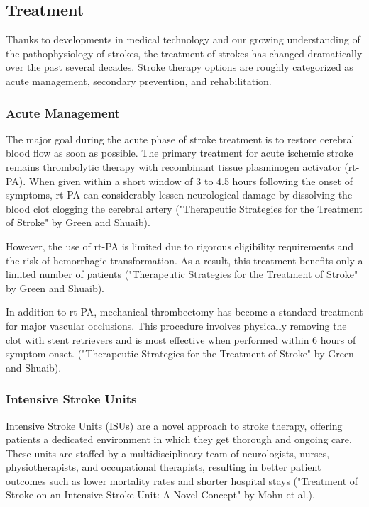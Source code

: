 \subsection{Treatment}
\label{sec:tretamentstroke}


Thanks to developments in medical technology and our growing understanding of the pathophysiology of strokes, the treatment of strokes has changed dramatically over the past several decades. Stroke therapy options are roughly categorized as acute management, secondary prevention, and rehabilitation. 

\subsubsection{Acute Management}
\label{sec:acutemanagement}
The major goal during the acute phase of stroke treatment is to restore cerebral blood flow as soon as possible. The primary treatment for acute ischemic stroke remains thrombolytic therapy with recombinant tissue plasminogen activator (rt-PA). When given within a short window of 3 to 4.5 hours following the onset of symptoms, rt-PA can considerably lessen neurological damage by dissolving the blood clot clogging the cerebral artery ("Therapeutic Strategies for the Treatment of Stroke" by Green and Shuaib).


However, the use of rt-PA is limited due to rigorous eligibility requirements and the risk of hemorrhagic transformation. As a result, this treatment benefits only a limited number of patients ("Therapeutic Strategies for the Treatment of Stroke" by Green and Shuaib).


In addition to rt-PA, mechanical thrombectomy has become a standard treatment for major vascular occlusions. This procedure involves physically removing the clot with stent retrievers and is most effective when performed within 6 hours of symptom onset. ("Therapeutic Strategies for the Treatment of Stroke" by Green and Shuaib).

\subsubsection{Intensive Stroke Units}
\label{sec:intstrokeunits}
Intensive Stroke Units (ISUs) are a novel approach to stroke therapy, offering patients a dedicated environment in which they get thorough and ongoing care. These units are staffed by a multidisciplinary team of neurologists, nurses, physiotherapists, and occupational therapists, resulting in better patient outcomes such as lower mortality rates and shorter hospital stays ("Treatment of Stroke on an Intensive Stroke Unit: A Novel Concept" by Mohn et al.).

